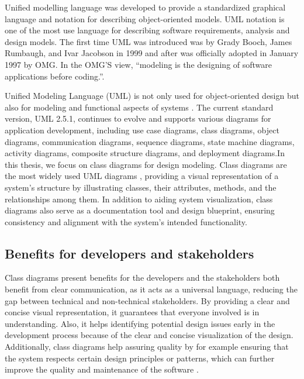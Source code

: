 Unified modelling language was developed to provide a standardized graphical language and notation for describing object-oriented models. UML notation is one of the most use language for describing software requirements, analysis and design models. 
The first time UML was introduced was by Grady Booch, James Rumbaugh, and Ivar Jacobson  in 1999 \cite{6BBooch1999} and after was officially adopted in January 1997 by OMG. In the OMG’S view, “modeling is the designing of software applications before coding.”.

Unified Modeling Language (UML) is not only used for object-oriented design but also for modeling and functional aspects of systems \cite{7BSergievskiy2018}. The current standard version, UML 2.5.1, continues to evolve and supports various diagrams for application development, including use case diagrams, class diagrams, object diagrams, communication diagrams, sequence diagrams, state machine diagrams, activity diagrams, composite structure diagrams, and deployment diagrams.In this thesis, we focus on class diagrams for  design modeling. Class diagrams are the most widely used UML diagrams \cite{8BImportanceClassDiagrams}, providing a visual representation of a system's structure by illustrating classes, their attributes, methods, and the relationships among them. In addition to aiding system visualization, class diagrams also serve as a documentation tool and design blueprint, ensuring consistency and alignment with the system's intended functionality.

\subsection{Benefits for developers and stakeholders}
Class diagrams present benefits for the developers and the stakeholders both benefit from clear communication, as it acts as a universal language, reducing the gap between technical and non-technical stakeholders. By providing a clear and concise visual representation, it guarantees that everyone involved is in understanding. Also, it helps identifying potential design issues early in the development process because of the clear and concise visualization of the design.
Additionally, class diagrams help assuring quality by for example ensuring that the system respects certain design principles or patterns, which can further improve the quality and maintenance of the software \cite{9BZapataBarra2018}.

